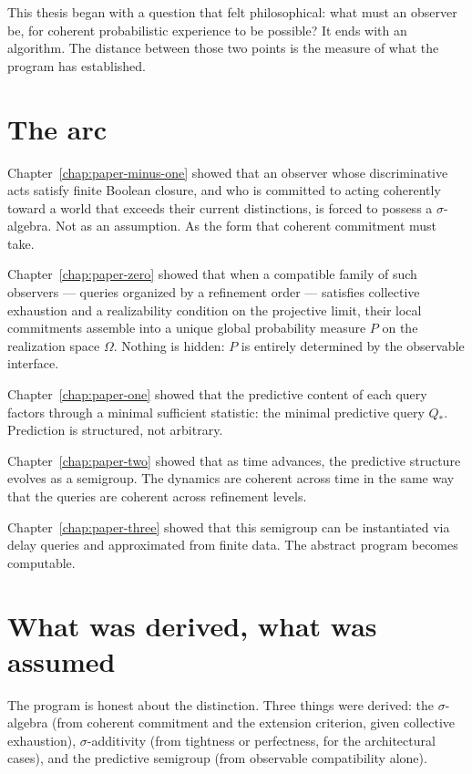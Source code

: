 
This thesis began with a question that felt philosophical: what must
an observer be, for coherent probabilistic experience to be possible?
It ends with an algorithm.  The distance between those two points is
the measure of what the program has established.

\section*{The arc}

Chapter~\ref{chap:paper-minus-one} showed that an observer whose
discriminative acts satisfy finite Boolean closure, and who is
committed to acting coherently toward a world that exceeds their
current distinctions, is forced to possess a $\sigma$-algebra.  Not
as an assumption.  As the form that coherent commitment must take.

Chapter~\ref{chap:paper-zero} showed that when a compatible family
of such observers --- queries organized by a refinement order ---
satisfies collective exhaustion and a realizability condition on the
projective limit, their local commitments assemble into a unique
global probability measure $P$ on the realization space $\Omega$.
Nothing is hidden: $P$ is entirely determined by the observable
interface.

Chapter~\ref{chap:paper-one} showed that the predictive content of
each query factors through a minimal sufficient statistic: the
minimal predictive query $Q_*$.  Prediction is structured, not
arbitrary.

Chapter~\ref{chap:paper-two} showed that as time advances, the
predictive structure evolves as a semigroup.  The dynamics are
coherent across time in the same way that the queries are coherent
across refinement levels.

Chapter~\ref{chap:paper-three} showed that this semigroup can be
instantiated via delay queries and approximated from finite data.
The abstract program becomes computable.

\section*{What was derived, what was assumed}

The program is honest about the distinction.  Three things were
derived: the $\sigma$-algebra (from coherent commitment and the
extension criterion, given collective exhaustion), $\sigma$-additivity
(from tightness or perfectness, for the architectural cases), and the
predictive semigroup (from observable compatibility alone).


